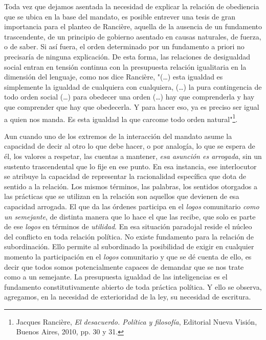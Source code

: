 \documentclass{book}
\begin{document}
Toda vez que dejamos asentada la necesidad de explicar la relación de
obediencia que se ubica en la base del mandato, es posible entrever una
tesis de gran importancia para el planteo de Rancière, aquella de la
ausencia de un fundamento trascendente, de un principio de gobierno
asentado en causas naturales, de fuerza, o de saber. Si así fuera, el
orden determinado por un fundamento a priori no precisaría de ninguna
explicación. De esta forma, las relaciones de desigualdad social entran
en tensión continua con la presupuesta relación igualitaria en la
dimensión del lenguaje, como nos dice Rancière, "(\dots) esta
igualdad es simplemente la igualdad de cualquiera con cualquiera,
(\dots) la pura contingencia de todo orden social (\dots) para
obedecer una orden (\dots) hay que comprenderla y hay que
comprender que hay que obedecerla. Y para hacer eso, ya es preciso ser
igual a quien nos manda. Es esta igualdad la que carcome todo orden
natural"\footnote{Jacques Rancière, \emph{El desacuerdo. Política y
  filosofía}, Editorial Nueva Visión, Buenos Aires, 2010, pp. 30 y 31.}.

Aun cuando uno de los extremos de la interacción del mandato asume la
capacidad de decir al otro lo que debe hacer, o por analogía, lo que se
espera de él, los valores a respetar, las cuentas a mantener, \emph{esa
asunción es arrogada}, sin un sustento trascendental que lo fije en ese
punto. En esa instancia, ese interlocutor se atribuye la capacidad de
representar la racionalidad específica que dota de sentido a la
relación. Los mismos términos, las palabras, los sentidos otorgados a
las prácticas que se utilizan en la relación son aquellos que devienen
de esa capacidad arrogada. El que da las órdenes participa en el
\emph{logos} comunitario \emph{como un semejante}, de distinta manera
que lo hace el que las recibe, que solo es parte de ese \emph{logos} en
términos de \emph{utilidad}. En esa situación paradojal reside el núcleo
del conflicto en toda relación política. No existe fundamento para la
relación de subordinación. Ello permite al subordinado la posibilidad de
exigir en cualquier momento la participación en el \emph{logos}
comunitario y que se dé cuenta de ello, es decir que todos somos
potencialmente capaces de demandar que se nos trate como a un semejante.
La presupuesta igualdad de las inteligencias es el fundamento
constitutivamente abierto de toda práctica política. Y ello se observa,
agregamos, en la necesidad de exterioridad de la ley, su necesidad de
escritura.
\end{document}
